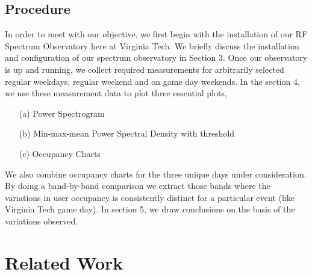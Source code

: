 \documentclass[12pt,sts]{report}
\begin{document}
	\subsection{Procedure}
	
	In order to meet with our objective, we first begin with the installation of our RF Spectrum Observatory here at Virginia Tech. We briefly discuss the installation and configuration of our spectrum observatory in Section 3. Once our observatory is up and running, we collect required measurements for arbitrarily selected regular weekdays, regular weekend and on game day weekends. In the section 4, we use these measurement data to plot three essential plots,
	\begin{enumerate}
		\item[(a)] Power Spectrogram
		\item[(b)] Min-max-mean Power Spectral Density with threshold
		\item[(c)] Occupancy Charts
	\end{enumerate}
	We also combine occupancy charts for the three unique days under consideration. By doing a band-by-band comparison we extract those bands where the variations in user occupancy is consistently distinct for a particular event (like Virginia Tech game day). In section 5, we draw conclusions on the basis of the variations observed.

\pagebreak

\section{Related Work}
\end{document}
